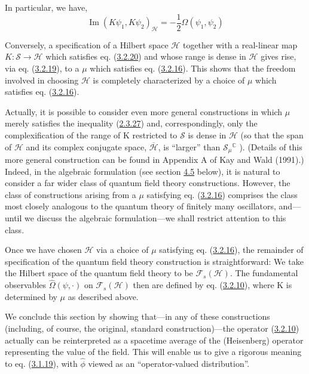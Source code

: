\documentclass[11pt,a4paper]{article}
\begin{document}
In particular, we have,
\begin{equation*}
\operatorname{Im}(K\psi_1, K\psi_2)_{\mathcal{H}} = -\frac{1}{2}\Omega(\psi_1, \psi_2) \tag{3.2.20}\label{eq:3.2.20}
\end{equation*}

Conversely, a specification of a Hilbert space \(\mathcal{H}\) together with a real-linear map \(K: \mathcal{S}\to\mathcal{H}\) which satisfies eq. (\hyperref[eq:3.2.20]{3.2.20}) and whose range is dense in \(\mathcal{H}\) gives rise, via eq. (\hyperref[eq:3.2.19]{3.2.19}), to a \(\mu\) which satisfies eq. (\hyperref[eq:3.2.16]{3.2.16}). This shows that the freedom involved in choosing \(\mathcal{H}\) is completely characterized by a choice of \(\mu\) which satisfies eq. (\hyperref[eq:3.2.16]{3.2.16}).

Actually, it is possible to consider even more general constructions\hypertarget{source-56}{} in which \(\mu\) merely satisfies the inequality (\hyperref[eq:2.3.27]{2.3.27}) and, correspondingly, only the complexification of the range of K restricted to \(\mathcal{S}\) is dense in \(\mathcal{H}\) (so that the span of \(\mathcal{H}\) and its complex conjugate space, \(\overline{\mathcal{H}}\), is ``larger'' than \(\mathcal{S}_{\mu}{}^{\mathbb C}\) ). (Details of this more general construction can be found in Appendix A of Kay and Wald (1991).) Indeed, in the algebraic formulation (see section \hyperlink{sec:4.5}{4.5} below), it is natural to consider a far wider class of quantum field theory constructions. However, the class of constructions arising from a \(\mu\) satisfying eq. (\hyperref[eq:3.2.16]{3.2.16}) comprises the class most closely analogous to the quantum theory of finitely many oscillators, and---until we discuss the algebraic formulation---we shall restrict attention to this class.

Once we have chosen \(\mathcal{H}\) via a choice of \(\mu\) satisfying eq. (\hyperref[eq:3.2.16]{3.2.16}), the remainder of specification of the quantum field theory construction is straightforward: We take the Hilbert space of the quantum field theory to be \(\mathcal{F}_s(\mathcal{H})\). The fundamental observables \(\widehat{\Omega}(\psi,\cdot)\) on \(\mathcal{F}_s(\mathcal{H})\) then are defined by eq. (\hyperref[eq:3.2.10]{3.2.10}), where K is determined by \(\mu\) as described above.

We conclude this section by showing that---in any of these constructions (including, of course, the original, standard construction)---the operator (\hyperref[eq:3.2.10]{3.2.10}) actually can be reinterpreted as a spacetime average of the (Heisenberg) operator representing the value of the field. This will enable us to give a rigorous meaning to eq. (\hyperref[eq:3.1.19]{3.1.19}), with \(\hat{\phi}\) viewed as an ``operator-valued distribution''.
\end{document}
